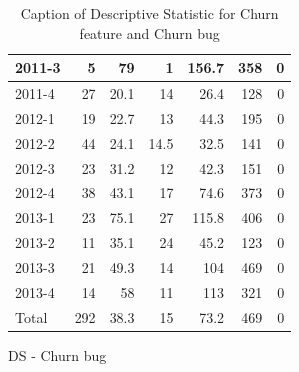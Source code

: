 \documentclass[UKenglish]{ifimaster}  %
\begin{document}
\begin{appendices}
\begin{table}[!htbp]
\begin{adjustwidth}{-2.5cm}{}
\begin{subfigure}[b]{0.3\textwidth}
{\begin{tabular}{ | l | r | r | r | r | r | r | }
 2011-3  & 5 & 79 & 1 & 156.7 & 358 & 0\\ \hline
 2011-4  & 27 & 20.1 & 14 & 26.4 & 128 & 0\\ \hline
 2012-1  & 19 & 22.7 & 13 & 44.3 & 195 & 0\\ \hline
 2012-2  & 44 & 24.1 & 14.5 & 32.5 & 141 & 0\\ \hline
 2012-3  & 23 & 31.2 & 12 & 42.3 & 151 & 0\\ \hline
 2012-4  & 38 & 43.1 & 17 & 74.6 & 373 & 0\\ \hline
 2013-1  & 23 & 75.1 & 27 & 115.8 & 406 & 0\\ \hline
 2013-2  & 11 & 35.1 & 24 & 45.2 & 123 & 0\\ \hline
 2013-3  & 21 & 49.3 & 14 & 104 & 469 & 0\\ \hline
 2013-4  & 14 & 58 & 11 & 113 & 321 & 0\\ \hline
 Total  & 292 & 38.3 & 15 & 73.2 & 469 & 0\\ \hline

\end{tabular}
}
\caption{DS - Churn bug}
 \label{DS:CB:10}
\end{subfigure}
\end{adjustwidth}
\caption[Optional caption for list of figures]{Caption of Descriptive Statistic for Churn feature and Churn bug}
\label{DS:10:4} %
\end{table}




\end{appendices}
\end{document}
